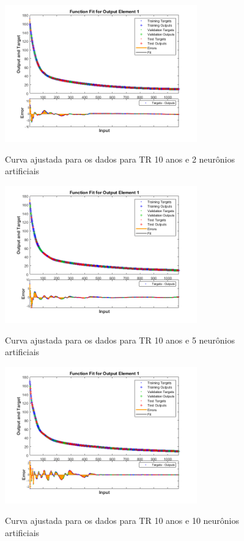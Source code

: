 \begin{figure}[h]
    \caption{Curva ajustada para os dados para TR 10 anos e 2 neurônios artificiais}
    \centering
    \includegraphics[width=0.74\textwidth]{Textuais/Figuras/NN/tr10-2neuronio.png}
    \label{fig:tr10-2n}
\end{figure}

\begin{figure}[h]
    \caption{Curva ajustada para os dados para TR 10 anos e 5 neurônios artificiais}
    \centering
    \includegraphics[width=0.74\textwidth]{Textuais/Figuras/NN/tr10-5neuronio.png}
    \label{fig:tr10-5n}
\end{figure}

\begin{figure}[h]
    \caption{Curva ajustada para os dados para TR 10 anos e 10 neurônios artificiais}
    \centering
    \includegraphics[width=0.74\textwidth]{Textuais/Figuras/NN/tr10-10neuronio.png}
    \label{fig:tr10-10n}
\end{figure}

